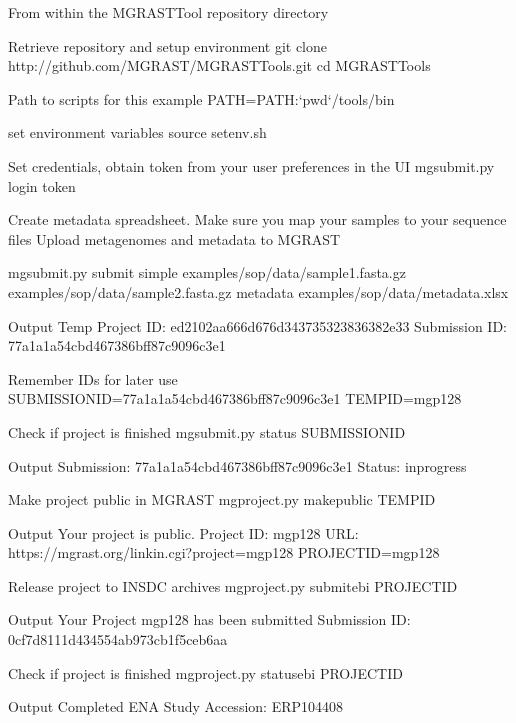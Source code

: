 \documentclass[letterpaper,10pt,english]{sphinxmanual}
\begin{document}
\begin{sphinxVerbatim}[commandchars=\\\{\}]
From within the MG\PYGZhy{}RAST\PYGZhy{}Tool repository directory

\PYGZsh{} Retrieve repository and setup environment
git clone http://github.com/MG\PYGZhy{}RAST/MG\PYGZhy{}RAST\PYGZhy{}Tools.git
cd MG\PYGZhy{}RAST\PYGZhy{}Tools

\PYGZsh{} Path to scripts for this example
PATH=\PYGZdl{}PATH:{}`pwd{}`/tools/bin

\PYGZsh{} set environment variables
source set\PYGZus{}env.sh

\PYGZsh{} Set credentials, obtain token from your user preferences in the UI
mg\PYGZhy{}submit.py login \PYGZhy{}\PYGZhy{}token

\PYGZsh{} Create metadata spreadsheet. Make sure you map your samples to your
\PYGZsh{} sequence files
\PYGZsh{} Upload metagenomes and metadata to MG\PYGZhy{}RAST

mg\PYGZhy{}submit.py submit simple \PYGZbs{}
           examples/sop/data/sample\PYGZus{}1.fasta.gz \PYGZbs{}
           examples/sop/data/sample\PYGZus{}2.fasta.gz \PYGZbs{}
           \PYGZhy{}\PYGZhy{}metadata examples/sop/data/metadata.xlsx

\PYGZsh{} Output
\PYGZgt{} Temp Project ID: ed2102aa666d676d343735323836382e33
\PYGZgt{} Submission ID: 77a1a1a5\PYGZhy{}4cbd\PYGZhy{}4673\PYGZhy{}86bf\PYGZhy{}f87c9096c3e1

\PYGZsh{} Remember IDs for later use
SUBMISSION\PYGZus{}ID=77a1a1a5\PYGZhy{}4cbd\PYGZhy{}4673\PYGZhy{}86bf\PYGZhy{}f87c9096c3e1
TEMP\PYGZus{}ID=mgp128

\PYGZsh{} Check if project is finished
mg\PYGZhy{}submit.py status \PYGZdl{}SUBMISSION\PYGZus{}ID

\PYGZsh{} Output
\PYGZgt{} Submission: 77a1a1a5\PYGZhy{}4cbd\PYGZhy{}4673\PYGZhy{}86bf\PYGZhy{}f87c9096c3e1 Status: in\PYGZhy{}progress


\PYGZsh{} Make project public in MG\PYGZhy{}RAST
mg\PYGZhy{}project.py make\PYGZhy{}public \PYGZdl{}TEMP\PYGZus{}ID

\PYGZsh{} Output
\PYGZgt{} \PYGZsh{} Your project is public.
\PYGZgt{} Project ID: mgp128
\PYGZgt{} URL: https://mg\PYGZhy{}rast.org/linkin.cgi?project=mgp128
PROJECT\PYGZus{}ID=mgp128

\PYGZsh{} Release project to INSDC archives
mg\PYGZhy{}project.py submit\PYGZhy{}ebi \PYGZdl{}PROJECT\PYGZus{}ID

\PYGZsh{} Output
\PYGZgt{} \PYGZsh{} Your Project mgp128 has been submitted
\PYGZgt{} Submission ID: 0cf7d811\PYGZhy{}1d43\PYGZhy{}4554\PYGZhy{}ab97\PYGZhy{}3cb1f5ceb6aa

\PYGZsh{} Check if project is finished
mg\PYGZhy{}project.py status\PYGZhy{}ebi \PYGZdl{}PROJECT\PYGZus{}ID

\PYGZsh{} Output
\PYGZgt{} Completed
\PYGZgt{} ENA Study Accession: ERP104408
\end{sphinxVerbatim}
\end{document}
